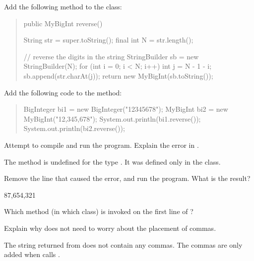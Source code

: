
Add the following method to the  class:

\begin{quote}
\begin{javalst}
public MyBigInt reverse() {
    String str = super.toString();
    final int N = str.length();

    // reverse the digits in the string
    StringBuilder sb = new StringBuilder(N);
    for (int i = 0; i < N; i++) {
        int j = N - 1 - i;
        sb.append(str.charAt(j));
    }
    return new MyBigInt(sb.toString());
}
\end{javalst}
\end{quote}

Add the following code to the  method:

\begin{quote}
\begin{javalst}
BigInteger bi1 = new BigInteger("12345678");
MyBigInt bi2 = new MyBigInt("12,345,678");
System.out.println(bi1.reverse());
System.out.println(bi2.reverse());
\end{javalst}
\end{quote}




\Q Attempt to compile and run the program. Explain the error in .

\begin{answer}
The method  is undefined for the type .
It was defined only in the  class.
\end{answer}


\Q Remove the line that caused the error, and run the program.
What is the result?

\begin{answer}[2em]
87,654,321
\end{answer}


\Q Which  method (in which class) is invoked on the first line of ?

\begin{answer}[2em]
\end{answer}


\Q Explain why  does not need to worry about the placement of commas.

\begin{answer}
The string returned from  does not contain any commas.
The commas are only added when  calls .
\end{answer}


